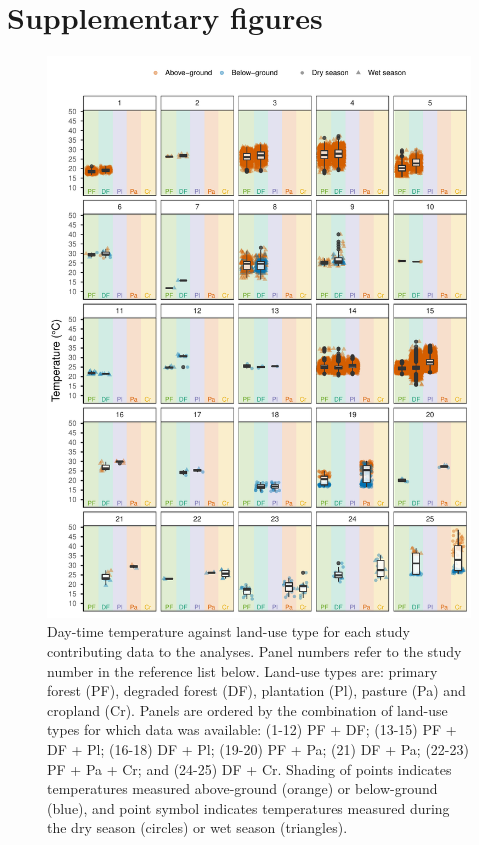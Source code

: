 \documentclass[12pt,a4paper,]{report}
\theoremstyle{definition}
\theoremstyle{definition}
\theoremstyle{definition}
\theoremstyle{remark}
\begin{document}
\section{Supplementary figures}\label{supplementary-figures-1}

\begin{figure}
\centering
\includegraphics{./output/fig-A-1-1-1.pdf}
\caption{\label{fig:fig-A-1-1}Day-time temperature against land-use type for
each study contributing data to the analyses. Panel numbers refer to the
study number in the reference list below. Land-use types are: primary
forest (PF), degraded forest (DF), plantation (Pl), pasture (Pa) and
cropland (Cr). Panels are ordered by the combination of land-use types
for which data was available: (1-12) PF + DF; (13-15) PF + DF + Pl;
(16-18) DF + Pl; (19-20) PF + Pa; (21) DF + Pa; (22-23) PF + Pa + Cr;
and (24-25) DF + Cr. Shading of points indicates temperatures measured
above-ground (orange) or below-ground (blue), and point symbol indicates
temperatures measured during the dry season (circles) or wet season
(triangles).}
\end{figure}
\end{document}
